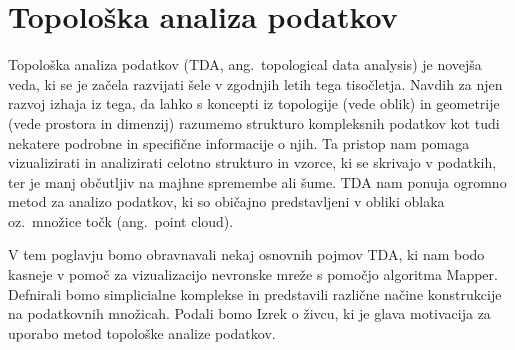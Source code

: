 \chapter{Topološka analiza podatkov}

Topološka analiza podatkov (TDA, ang.\ topological data analysis) je novejša veda, ki se je začela razvijati šele v zgodnjih letih tega tisočletja. Navdih za njen razvoj izhaja iz tega, da lahko s koncepti iz topologije (vede oblik) in geometrije (vede prostora in dimenzij)  razumemo strukturo kompleksnih podatkov kot tudi nekatere podrobne in specifične informacije o njih. Ta pristop nam pomaga vizualizirati in analizirati celotno strukturo in vzorce, ki se skrivajo v podatkih, ter je manj občutljiv na majhne spremembe ali šume. TDA nam ponuja ogromno metod za analizo podatkov, ki so običajno predstavljeni v obliki oblaka oz.\ množice točk (ang.\ point cloud).

V tem poglavju bomo obravnavali nekaj osnovnih pojmov TDA, ki nam bodo kasneje v pomoč za vizualizacijo nevronske mreže s pomočjo algoritma Mapper. Defnirali bomo simplicialne komplekse in predstavili različne načine konstrukcije na podatkovnih množicah. Podali bomo Izrek o živcu, ki je glava motivacija za uporabo metod topološke analize podatkov.



